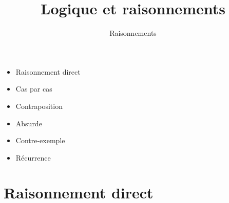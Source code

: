 



\title{{\bf Logique et raisonnements}}
\subtitle{Raisonnements}
\author{}

\date{}



\begin{frame}
  
  \debutmontitre

  \pause

{\footnotesize
\hfill
{}
\begin{minipage}{0.6\textwidth}
  \begin{itemize}
    \item<3-> Raisonnement direct
    \item<4-> Cas par cas
    \item<5-> Contraposition
    \item<6-> Absurde
    \item<7-> Contre-exemple
    \item<8-> Récurrence
  \end{itemize}
\end{minipage}
}

\end{frame}

\setcounter{framenumber}{0}





\section{Raisonnement direct}

